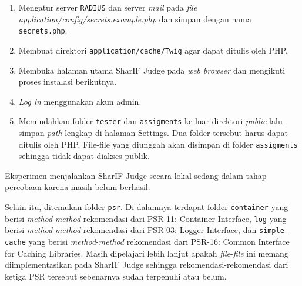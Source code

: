 \documentclass[a4paper,twoside]{article}
\begin{document}
\begin{enumerate}
\begin{enumerate}
			\item Mengatur server \verb|RADIUS| dan server \textit{mail} pada \textit{file application/config/secrets.example.php} dan simpan dengan nama \verb|secrets.php|.
			\item Membuat direktori \verb|application/cache/Twig| agar dapat ditulis oleh PHP.
			\item Membuka halaman utama SharIF Judge pada \textit{web browser} dan mengikuti proses instalasi berikutnya.
			\item \textit{Log in} menggunakan akun admin.
			\item Memindahkan folder \verb|tester| dan \verb|assigments| ke luar direktori \textit{public} lalu simpan \textit{path} lengkap di halaman Settings. Dua folder tersebut harus dapat ditulis oleh PHP. File-file yang diunggah
			akan disimpan di folder \verb|assigments| sehingga tidak dapat diakses publik.
		\end{enumerate}
		
		Eksperimen menjalankan SharIF Judge secara lokal sedang dalam tahap percobaan karena masih belum berhasil.
		
		Selain itu, ditemukan folder \verb|psr|. Di dalamnya terdapat folder \verb|container| yang berisi \textit{method}-\textit{method} rekomendasi dari PSR-11: Container Interface, \verb|log| yang berisi \textit{method}-\textit{method} rekomendasi dari PSR-03: Logger Interface, dan \verb|simple-cache| yang berisi \textit{method}-\textit{method} rekomendasi dari PSR-16: Common Interface for Caching Libraries. Masih dipelajari lebih lanjut apakah \textit{file}-\textit{file} ini memang diimplementasikan pada SharIF Judge sehingga rekomendasi-rekomendasi dari ketiga PSR tersebut sebenarnya sudah terpenuhi atau belum.  
		

\end{enumerate}
\end{document}
